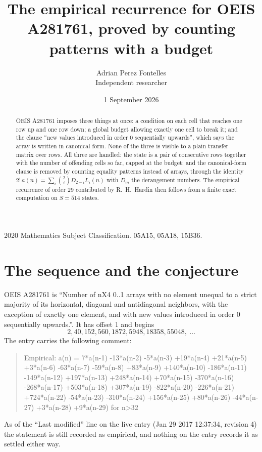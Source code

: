 \documentclass[11pt,a4paper]{article}
\title{The empirical recurrence for OEIS A281761, proved by counting patterns with a budget}
\author{Adrian Perez Fontelles\\ \small Independent researcher}
\date{1 September 2026}
\theoremstyle{plain}
\theoremstyle{definition}
\begin{document}
\maketitle

\begin{abstract}
OEIS A281761 imposes three things at once: a condition on each cell that reaches one row up and
one row down; a global budget allowing exactly one cell to
break it; and the clause ``new values introduced in order $0$ sequentially upwards'', which
says the array is written in canonical form. None of the three is visible to a plain transfer
matrix over rows. All three are handled: the state is a pair of consecutive rows
together with the number of offending cells so far, capped at the budget; and the
canonical-form clause is removed by counting equality patterns instead of arrays, through the
identity $2!\,a(n)=\sum_i\binom{2}{i}D_{2-i}L_i(n)$ with $D_m$ the derangement
numbers. The empirical recurrence of order $29$ contributed by R.~H.~Hardin then follows
from a finite exact computation on $S=514$ states.
\end{abstract}

\noindent\small 2020 Mathematics Subject Classification. 05A15, 05A18, 15B36.\normalsize

\section{The sequence and the conjecture}

OEIS A281761 is ``Number of nX4 0..1 arrays with no element unequal to a strict majority of its horizontal, diagonal and antidiagonal neighbors, with the exception of exactly one element, and with new values introduced in order 0 sequentially upwards.''. It has offset $1$ and begins
\[
2, 40, 152, 560, 1872, 5948, 18358, 55048,\ \dots
\]
The entry carries the following comment:
\begin{quote}\small
Empirical: a(n) = 7*a(n-1) -13*a(n-2) -5*a(n-3) +19*a(n-4) +21*a(n-5) +3*a(n-6) -63*a(n-7) -59*a(n-8) +83*a(n-9) +140*a(n-10) -186*a(n-11) -149*a(n-12) +197*a(n-13) +248*a(n-14) +70*a(n-15) -370*a(n-16) -268*a(n-17) +503*a(n-18) +307*a(n-19) -822*a(n-20) -226*a(n-21) +724*a(n-22) -54*a(n-23) -310*a(n-24) +156*a(n-25) +80*a(n-26) -44*a(n-27) +3*a(n-28) +9*a(n-29) for n>32
\end{quote}
As of the ``Last modified'' line on the live entry (Jan 29 2017 12:37:34, revision 4) the statement is
still recorded as empirical, and nothing on the entry records it as settled either way.
\end{document}
